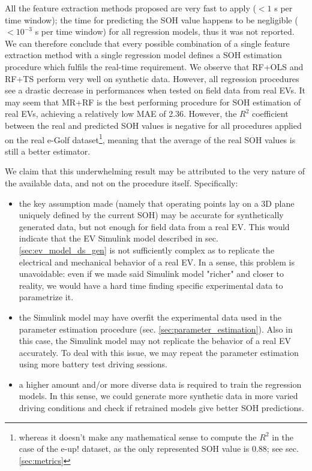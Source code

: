 All the feature extraction methods proposed are very fast to apply ($<1$ s per time window); the time for predicting the SOH value happens to be negligible ($<10^{-3}$ s per time window) for all regression models, thus it was not reported. We can therefore conclude that every possible combination of a single feature extraction method with a single regression model defines a SOH estimation procedure which fulfils the real-time requirement. We observe that RF+OLS and RF+TS perform very well on synthetic data. However, all regression procedures see a drastic decrease in performances when tested on field data from real EVs. It may seem that MR+RF is the best performing procedure for SOH estimation of real EVs, achieving a relatively low MAE of 2.36. However, the $R^2$ coefficient between the real and predicted SOH values is negative for all procedures applied on the real e-Golf dataset\footnote{whereas it doesn't make any mathematical sense to compute the $R^2$ in the case of the e-up! dataset, as the only represented SOH value is 0.88; see sec. \ref{sec:metrics}}, meaning that the average of the real SOH values is still a better estimator.

We claim that this underwhelming result may be attributed to the very nature of the available data, and not on the procedure itself. Specifically:
\begin{itemize}
    \item the key assumption made (namely that operating points lay on a 3D plane uniquely defined by the current SOH) may be accurate for synthetically generated data, but not enough for field data from a real EV. This would indicate that the EV Simulink model described in sec. \ref{sec:ev_model_ds_gen} is not sufficiently complex as to replicate the electrical and mechanical behavior of a real EV. In a sense, this problem is unavoidable: even if we made said Simulink model "richer" and closer to reality, we would have a hard time finding specific experimental data to parametrize it.
    \item the Simulink model may have overfit the experimental data used in the parameter estimation procedure (sec. \ref{sec:parameter_estimation}). Also in this case, the Simulink model may not replicate the behavior of a real EV accurately. To deal with this issue, we may repeat the parameter estimation using more battery test driving sessions.
    \item a higher amount and/or more diverse data is required to train the regression models. In this sense, we could generate more synthetic data in more varied driving conditions and check if retrained models give better SOH predictions.
\end{itemize}

